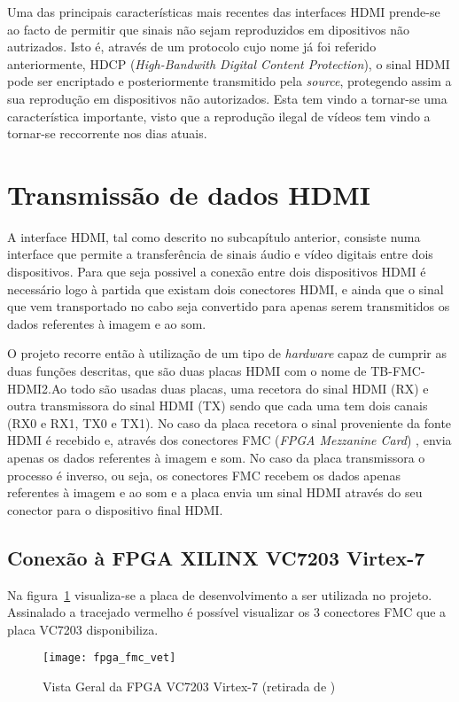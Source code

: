 Uma das principais características mais recentes das interfaces HDMI prende-se ao facto de permitir que sinais não sejam reproduzidos em dipositivos não autrizados. Isto é, através de um protocolo cujo nome já foi referido anteriormente, HDCP (\textit{High-Bandwith Digital Content Protection}), o sinal HDMI pode ser encriptado e posteriormente transmitido pela \textit{source}, protegendo assim a sua reprodução em dispositivos não autorizados. Esta tem vindo a tornar-se uma característica importante, visto que a reprodução ilegal de vídeos tem vindo a tornar-se reccorrente nos dias atuais.

\section{Transmissão de dados HDMI}\label{sec:HDMIinFPGA}
A interface HDMI, tal como descrito no subcapítulo anterior, consiste numa interface que permite a transferência de sinais áudio e vídeo digitais entre dois dispositivos. Para que seja possivel a conexão entre dois dispositivos HDMI é necessário logo à partida que existam dois conectores HDMI, e ainda que o sinal que vem transportado no cabo seja convertido para apenas serem transmitidos os dados referentes à imagem e ao som.   

O projeto recorre então à utilização de um tipo de \textit{hardware} capaz de cumprir as duas funções descritas, que são duas placas HDMI com o nome de TB-FMC-HDMI2.Ao todo são usadas duas placas, uma recetora do sinal HDMI (RX) e outra transmissora do sinal HDMI (TX) sendo que cada uma tem dois canais (RX0 e RX1, TX0 e TX1). No caso da placa recetora o sinal proveniente da fonte HDMI é recebido e, através dos conectores FMC  (\textit{FPGA Mezzanine Card}) , envia apenas os dados referentes à imagem e som. No caso da placa transmissora o processo é inverso, ou seja, os conectores FMC recebem os dados apenas referentes à imagem e ao som e a placa envia um sinal HDMI através do seu conector para o dispositivo final HDMI.

\subsection{Conexão à FPGA XILINX VC7203 Virtex-7} \label{subsec:HDMIconexao} 
Na figura~\ref{fig:fpgaVistaGeral}  visualiza-se a placa de desenvolvimento a ser utilizada no projeto. Assinalado a tracejado vermelho é possível visualizar os 3 conectores FMC que a placa VC7203 disponibiliza.

\begin{figure}[h!]
	\begin{center}
		\leavevmode
		\texttt{[image: fpga\_fmc\_vet]}
		\caption[Vista Geral da FPGA VC7203 Virtex-7]{Vista Geral da FPGA VC7203 Virtex-7 (retirada de \cite{R008})}
		\label{fig:fpgaVistaGeral}
	\end{center}
\end{figure}

